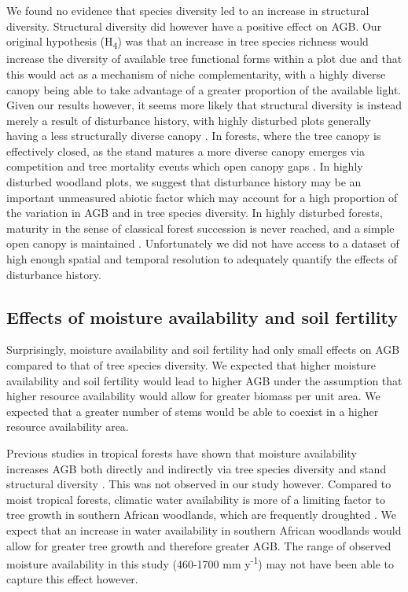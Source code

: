 \documentclass[11pt,a4paper]{article}
\begin{document}
We found no evidence that species diversity led to an increase in structural diversity. Structural diversity did however have a positive effect on AGB. Our original hypothesis (H\textsubscript{4}) was that an increase in tree species richness would increase the diversity of available tree functional forms within a plot due and that this would act as a mechanism of niche complementarity, with a highly diverse canopy being able to take advantage of a greater proportion of the available light. Given our results however, it seems more likely that structural diversity is instead merely a result of disturbance history, with highly disturbed plots generally having a less structurally diverse canopy \citep{}. In forests, where the tree canopy is effectively closed, as the stand matures a more diverse canopy emerges via competition and tree mortality events which open canopy gaps \citep{}. In highly disturbed woodland plots, we suggest that disturbance history may be an important unmeasured abiotic factor which may account for a high proportion of the variation in AGB \citep{} and in tree species diversity. In highly disturbed forests, maturity in the sense of classical forest succession is never reached, and a simple open canopy is maintained \citep{}. Unfortunately we did not have access to a dataset of high enough spatial and temporal resolution to adequately quantify the effects of disturbance history. 

\subsection{Effects of moisture availability and soil fertility}

Surprisingly, moisture availability and soil fertility had only small effects on AGB compared to that of tree species diversity. We expected that higher moisture availability and soil fertility would lead to higher AGB under the assumption that higher resource availability would allow for greater biomass per unit area. We expected that a greater number of stems would be able to coexist in a higher resource availability area.

Previous studies in tropical forests have shown that moisture availability increases AGB both directly and indirectly via tree species diversity and stand structural diversity \citep{Ali2019a, Ali2019b, Poorter2017}. This was not observed in our study however. Compared to moist tropical forests, climatic water availability is more of a limiting factor to tree growth in southern African woodlands, which are frequently droughted \citep{}. We expect that an increase in water availability in southern African woodlands would allow for greater tree growth and therefore greater AGB. The range of observed moisture availability in this study (\textapprox{}460-1700 mm y\textsuperscript{-1}) may not have been able to capture this effect however.
\end{document}
